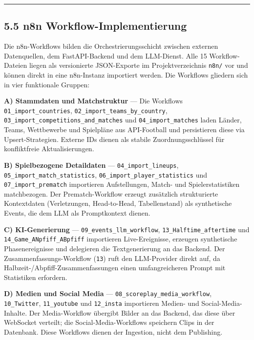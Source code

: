 \begin{center}\rule{0.5\linewidth}{0.5pt}\end{center}

\subsection{5.5 n8n
Workflow-Implementierung}\label{n8n-workflow-implementierung}

Die n8n-Workflows bilden die Orchestrierungsschicht zwischen externen
Datenquellen, dem FastAPI-Backend und dem LLM-Dienst. Alle 15
Workflow-Dateien liegen als versionierte JSON-Exporte im
Projektverzeichnis \texttt{n8n/} vor und können direkt in eine
n8n-Instanz importiert werden. Die Workflows gliedern sich in vier
funktionale Gruppen:

\textbf{A) Stammdaten und Matchstruktur} --- Die Workflows
\texttt{01\_import\_countries}, \texttt{02\_import\_teams\_by\_country},
\texttt{03\_import\_competitions\_and\_matches} und
\texttt{04\_import\_matches} laden Länder, Teams, Wettbewerbe und
Spielpläne aus API-Football und persistieren diese via
Upsert-Strategien. Externe IDs dienen als stabile Zuordnungsschlüssel
für konfliktfreie Aktualisierungen.

\textbf{B) Spielbezogene Detaildaten} --- \texttt{04\_import\_lineups},
\texttt{05\_import\_match\_statistics},
\texttt{06\_import\_player\_statistics} und
\texttt{07\_import\_prematch} importieren Aufstellungen, Match- und
Spielerstatistiken matchbezogen. Der Prematch-Workflow erzeugt
zusätzlich strukturierte Kontextdaten (Verletzungen, Head-to-Head,
Tabellenstand) als synthetische Events, die dem LLM als Promptkontext
dienen.

\textbf{C) KI-Generierung} --- \texttt{09\_events\_llm\_workflow},
\texttt{13\_Halftime\_aftertime} und \texttt{14\_Game\_ANpfiff\_ABpfiff}
importieren Live-Ereignisse, erzeugen synthetische Phasenereignisse und
delegieren die Textgenerierung an das Backend. Der
Zusammenfassungs-Workflow (\texttt{13}) ruft den LLM-Provider direkt
auf, da Halbzeit-/Abpfiff-Zusammenfassungen einen umfangreicheren Prompt
mit Statistiken erfordern.

\textbf{D) Medien und Social Media} ---
\texttt{08\_scoreplay\_media\_workflow}, \texttt{10\_Twitter},
\texttt{11\_youtube} und \texttt{12\_insta} importieren Medien- und
Social-Media-Inhalte. Der Media-Workflow übergibt Bilder an das Backend,
das diese über WebSocket verteilt; die Social-Media-Workflows speichern
Clips in der Datenbank. Diese Workflows dienen der Ingestion, nicht dem
Publishing.

